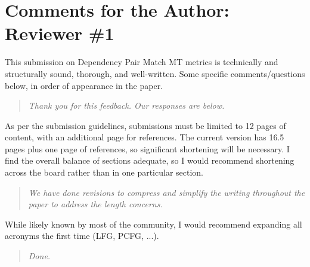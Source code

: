 \documentclass[letterpaper,12pt]{article}
\newenvironment{response}
{\begin{quotation} \it}
  {\end{quotation}}
\begin{document}
\section{Comments for the Author: Reviewer \#1}
\label{sec:reviewer1}

This submission on Dependency Pair Match MT metrics is technically and
structurally sound, thorough, and well-written.  Some specific
comments/questions below, in order of appearance in the paper.
\begin{response}
  Thank you for this feedback. Our responses are below.
\end{response}
As per the submission guidelines, submissions must be limited to 12
pages of content, with an additional page for references.  The current
version has 16.5 pages plus one page of references, so significant
shortening will be necessary.  I find the overall balance of sections
adequate, so I would recommend shortening across the board rather than
in one particular section.
\begin{response}
  We have done revisions to compress and simplify the writing
  throughout the paper to address the length concerns.
\end{response}
While likely known by most of the community, I would recommend
expanding all acronyms the first time (LFG, PCFG, ...).
\begin{response}
  Done.
\end{response}
\end{document}
